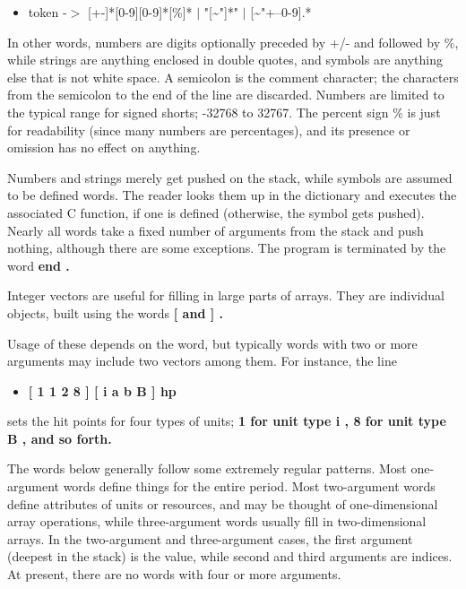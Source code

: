 \begin{itemize}
\item
token -$>$ [+-]*[0-9][0-9]*[\%]* $|$ "[\~{}"]*" $|$ [\~{}"+--0-9].*
\end{itemize}\par\noindent
In other words,
numbers are digits optionally preceded by +/- and followed by \%,
while strings are anything enclosed in double quotes, and symbols are
anything else that is not white space.  A semicolon is the comment character;
the characters from the semicolon to the end of the line are discarded.
Numbers are limited to the typical range for signed shorts; -32768 to 32767.
The percent sign \% is just for readability (since many numbers are
percentages), and its presence or omission has no effect on anything.
\par\noindent
Numbers and strings merely get pushed on the stack, while symbols are
assumed to be defined words.  The reader looks them up in the dictionary
and executes the associated C function, if one is defined (otherwise, the
symbol gets pushed).  Nearly all words take a fixed number of arguments
from the stack and push nothing, although there are some exceptions.
The program is terminated by the word %
\bf end\rm%
.
\par\noindent
Integer vectors are useful for filling in large parts of arrays.
They are individual objects, built using the words %
\bf [ \rm%
and %
\bf ]\rm%
.
\par\noindent
Usage of these depends on the word, but typically words with two or more
arguments may include two vectors among them.  For instance, the line
\begin{itemize}
\item
\bf [ 1 1 2 8 ]  [ i a b B ]  hp  \rm%
\end{itemize}\par\noindent
sets the hit points for four types of units;
%
\bf 1 \rm%
for unit type %
\bf i\rm%
, %
\bf 8 \rm%
for unit type %
\bf B\rm%
, and so forth.
\par\noindent
The words below generally follow some extremely regular patterns.
Most one-argument words define things for the entire period.
Most two-argument words define attributes of units or resources, and
may be thought of one-dimensional array operations, while three-argument
words usually fill in two-dimensional arrays.
In the two-argument and
three-argument cases, the first argument (deepest in the stack) is the
value, while second and third arguments are indices.
At present, there are no words with four or more arguments.
